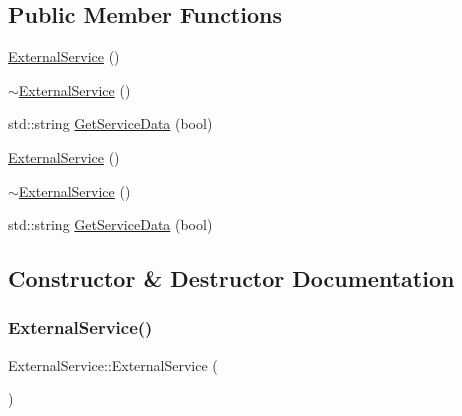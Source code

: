 \subsection*{Public Member Functions}
\begin{DoxyCompactItemize}
\item 
\mbox{\hyperlink{class_external_service_aee033b98c98424e87e5165a2f9077d15}{External\+Service}} ()
\item 
\mbox{\hyperlink{class_external_service_a551568814f3fc45d6981937a1436132d}{$\sim$\+External\+Service}} ()
\item 
std\+::string \mbox{\hyperlink{class_external_service_acf6df99a7f8f5cc56cc7d923224ca0c3}{Get\+Service\+Data}} (bool)
\item 
\mbox{\hyperlink{class_external_service_aee033b98c98424e87e5165a2f9077d15}{External\+Service}} ()
\item 
\mbox{\hyperlink{class_external_service_a551568814f3fc45d6981937a1436132d}{$\sim$\+External\+Service}} ()
\item 
std\+::string \mbox{\hyperlink{class_external_service_acf6df99a7f8f5cc56cc7d923224ca0c3}{Get\+Service\+Data}} (bool)
\end{DoxyCompactItemize}


\subsection{Constructor \& Destructor Documentation}
\mbox{\label{class_external_service_aee033b98c98424e87e5165a2f9077d15}} 
\subsubsection{\texorpdfstring{ExternalService()}{ExternalService()}\hspace{0.1cm}{\footnotesize\ttfamily [1/2]}}
{\footnotesize\ttfamily External\+Service\+::\+External\+Service (\begin{DoxyParamCaption}{ }\end{DoxyParamCaption})}

\mbox{\label{class_external_service_a551568814f3fc45d6981937a1436132d}} 
